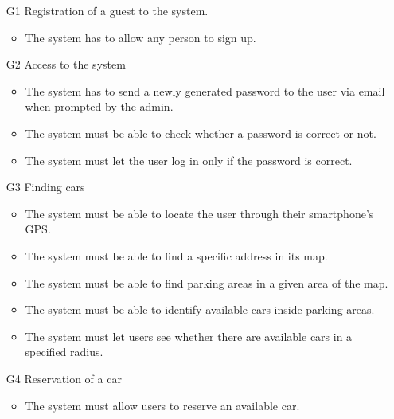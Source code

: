 \begin{itemize}

	
	\item [G1] Registration of a guest to the system.%
		\begin{itemize}
			\item The system has to allow any person to sign up. %
		\end{itemize}
	\item [G2] Access to the system %
		\begin{itemize}
			\item The system has to send a newly generated password to the user via email when prompted by the admin.
			\item The system must be able to check whether a password is correct or not.
			\item The system must let the user log in only if the password is correct. 
		\end{itemize}
	\item [G3] Finding cars %
		\begin{itemize}
			\item The system must be able to locate the user through their smartphone's GPS.
			\item The system must be able to find a specific address in its map. %
			\item The system must be able to find parking areas in a given area of the map. 
			\item The system must be able to identify available cars inside parking areas.
			\item The system must let users see whether there are available cars in a specified radius. 
		\end{itemize}
	\item [G4] Reservation of a car %
		\begin{itemize}
			\item The system must allow users to reserve an available car.

\end{itemize}
\end{itemize}
